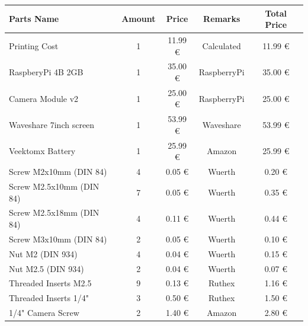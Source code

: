 \begin{table}[H]
    \centering
    \begin{tabular}{|l|c|c|c|c|}
        \hline
        \textbf{Parts Name}          & \textbf{Amount} & \textbf{Price} & \textbf{Remarks} & \textbf{Total Price} \\ \hline
        Printing Cost                & 1               & 11.99 €        & Calculated       & 11.99 €              \\ \hline
        RaspberyPi 4B 2GB            & 1               & 35.00 €        & RaspberryPi      & 35.00 €              \\ \hline
        Camera Module v2             & 1               & 25.00 €        & RaspberryPi      & 25.00 €              \\ \hline
        Waveshare 7inch screen       & 1               & 53.99 €        & Waveshare        & 53.99 €              \\ \hline
        Veektomx Battery             & 1               & 25.99 €        & Amazon           & 25.99 €              \\ \hline
        Screw M2x10mm (DIN 84)       & 4               & 0.05 €         & Wuerth           & 0.20 €               \\ \hline
        Screw M2.5x10mm (DIN 84)     & 7               & 0.05 €         & Wuerth           & 0.35 €               \\ \hline
        Screw M2.5x18mm (DIN 84)     & 4               & 0.11 €         & Wuerth           & 0.44 €               \\ \hline
        Screw M3x10mm (DIN 84)       & 2               & 0.05 €         & Wuerth           & 0.10 €               \\ \hline
        Nut M2 (DIN 934)             & 4               & 0.04 €         & Wuerth           & 0.15 €               \\ \hline
        Nut M2.5 (DIN 934)           & 2               & 0.04 €         & Wuerth           & 0.07 €               \\ \hline
        Threaded Inserts M2.5        & 9               & 0.13 €         & Ruthex           & 1.16 €               \\ \hline
        Threaded Inserts 1/4"        & 3               & 0.50 €         & Ruthex           & 1.50 €               \\ \hline
        1/4" Camera Screw            & 2               & 1.40 €         & Amazon           & 2.80 €               \\ \hline

\end{tabular}
\end{table}
